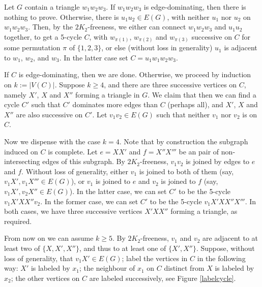 \documentclass[runningheads,a4paper]{llncs}
\begin{document}
Let $G$  contain a triangle $w_1w_2w_3$.  If $w_1w_2w_3$ is edge-dominating,
then there is nothing to prove. Otherwise, there is $u_1u_2\in
E(G)$, with neither $u_1$ nor $u_2$  on $w_1w_2w_3$.  Then, by the
$2K_2$-freeness, we either can connect $w_1w_2w_3$ and $u_1u_2$ together, to get a
5-cycle $C$, with $w_{\pi(1)}$, $w_{\pi(2)}$ and $w_{\pi(3)}$ successive on $C$
for some permutation $\pi$ of $\{1,2,3\}$, or else (without loss in generality)
$u_1$ is adjacent to $w_1$, $w_2$, and $w_3$. In the latter case set $C=u_1w_1w_2w_3$.

If $C$ is edge-dominating, then we are done. Otherwise, we proceed by induction on
$k:=|V(C)|$. 
Suppose $k\ge 4$, and there are three successive vertices on $C$, namely $X'$, $X$ and $X''$ forming a triangle in $G$. 
We claim that then we can find a cycle $C'$ such that $C'$ dominates more edges than $C$ (perhaps all), 
and $X'$, $X$ and $X''$ are also successive on $C'$.
Let $v_1v_2\in E(G)$ such that neither $v_1$ nor $v_2$ is on $C$.

Now we dispense with the case $k=4$. Note that by construction the subgraph
induced on $C$ is complete.  Let $e=XX'$ and $f=X''X'''$ be an pair of
non-intersecting edges of this subgraph.  By $2K_2$-freeness, $v_1v_2$ is
joined by edges to $e$ and $f$.  Without loss of generality, either $v_1$ is
joined to both of them (say, $v_1X', v_1X'''\in E(G)$), or $v_1$ is joined to
$e$ and $v_2$ is joined to $f$ (say, $v_1X', v_2X''\in E(G)$).  In the latter
case, we can set $C'$ to be the 5-cycle $v_1X'XX''v_2$.  In the former case, we
can set $C'$ to be the 5-cycle $v_1X'XX''X'''$.  In both cases, we have three successive
vertices $X'XX''$ forming a triangle, as required.

From now on we can assume $k\geq 5$.
By $2K_2$-freeness, $v_1$ and $v_2$ are adjacent to at least two of $\{X,X',X''\}$,
and thus to at least one of $\{X',X''\}$.  Suppose,
without loss of generality, that $v_1X'\in E(G)$; label the vertices in $C$ in the following way:
$X'$ is labeled by $x_1$; the neighbour of $x_1$ on $C$ distinct from $X$ is labeled by $x_2$;
the other vertices on $C$ are labeled successively, see Figure \ref{labelcycle}.
\end{document}
